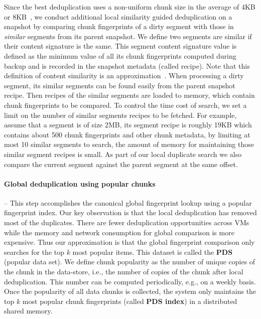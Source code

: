 Since the best deduplication uses a non-uniform chunk size 
in the average of 4KB or 8KB~\cite{Jin2009},
we conduct additional local similarity guided deduplication on a snapshot by comparing
chunk fingerprints of a dirty segment 
with those in  {\em similar} segments from its parent snapshot. 
We define two segments are similar if their content signature is the same.
This segment content signature value is defined as the minimum value of all its chunk fingerprints 
computed during backup and is recorded in the snapshot metadata (called recipe). Note that this definition of
content similarity is an approximation~\cite{resemblance97}.  When processing a dirty segment,
its  similar segments can be found easily from the
parent snapshot recipe.  Then recipes of the similar segments are loaded to memory,
which contain chunk fingerprints to be compared.
To control the time cost of search, we set a limit on the number of  similar segments recipes to be fetched. 
For example, assume that  a segment is of size  2MB, 
its segment recipe is roughly 19KB which contains about 500 chunk fingerprints and other chunk metadata,
by limiting at most 10 similar segments to search, the amount of memory for maintaining those 
similar segment recipes is small.
As part of our local duplicate search we also compare the current segment
against the parent segment at the same offset.

\paragraph*{Global deduplication using popular chunks} --
This step accomplishes the canonical global fingerprint lookup using a popular fingerprint index.
Our key observation is that the local deduplication has removed most of the duplicates.
There are fewer deduplication opportunities across VMs while the memory and network
consumption for global comparison is more expensive.
Thus our approximation is that the global fingerprint comparison only searches for the top $k$
most popular items. This dataset is called the \textbf{PDS} (popular data set). 
We define chunk popularity as the number of unique copies of the chunk in the data-store,
i.e., the number of copies of the chunk after local deduplication.
This number can be computed periodically, e.g., on a weekly basis.
Once the popularity of all data chunks is collected, the system only maintains the top $k$
most popular chunk fingerprints (called \textbf{PDS index}) in a distributed shared memory.  

